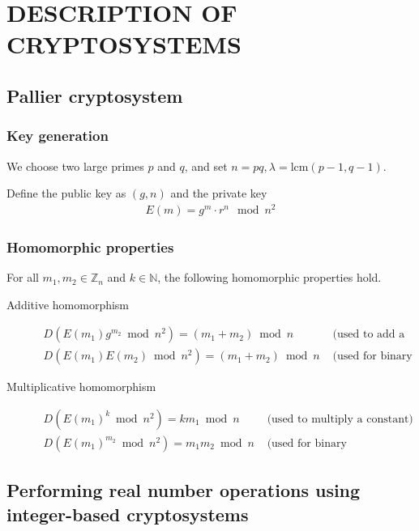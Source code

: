 

\chapter{DESCRIPTION OF CRYPTOSYSTEMS}
\section{Pallier cryptosystem}
\subsection{Key generation}
We choose two large primes $p$ and $q$, and set $n = pq, \lambda = \mathrm{lcm}(p-1,q-1)$.

Define the public key as $(g,n)$ and the private key
\begin{align*}
  E(m) = g^m \cdot r^n \mod{n^2}
\end{align*}
\subsection{Homomorphic properties}
For all $m_1,m_2 \in \mathbb{Z}_n$ and $k\in \mathbb{N}$, the following homomorphic properties hold.
\begin{description}
  \item[Additive homomorphism]
  \begin{align*}
    D(E(m_1)g^{m_2}\bmod n^2)=(m_1+m_2)\bmod n & \text{ (used to add a constant)}\\
    D(E(m_1)E(m_2)\bmod n^2)=(m_1+m_2)\bmod n & \text{ (used for binary addition)}
  \end{align*}
  \item[Multiplicative homomorphism]
  \begin{align*}
    D(E(m_1)^k\bmod n^2)= km_1\bmod n & \text{ (used to multiply a constant)}\\
    D(E(m_1)^{m_2}\bmod n^2)= m_1m_2\bmod n & \text{ (used for binary multiplication)}
  \end{align*}
\end{description}
\section{Performing real number operations using integer-based cryptosystems}
